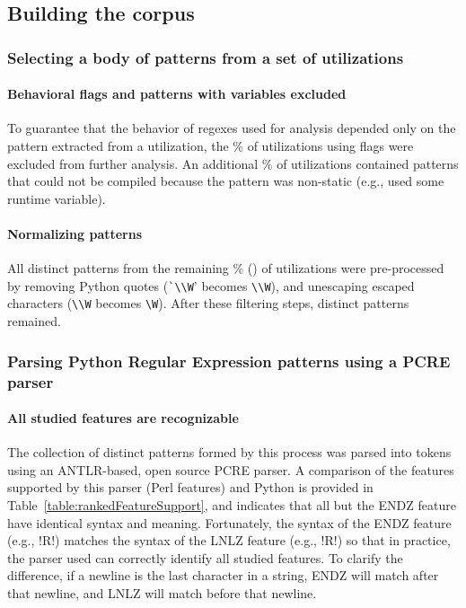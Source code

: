 \subsection{Building the corpus}
\subsubsection{Selecting a body of patterns from a set of utilizations}
\paragraph{Behavioral flags and patterns with variables excluded} To guarantee that the behavior of regexes used for analysis depended only on the pattern extracted from a utilization, the \%  of utilizations using flags were excluded from further analysis.  An additional \% of utilizations contained patterns that could not be compiled because the pattern was non-static (e.g., used some runtime variable).

\paragraph{Normalizing patterns} All distinct patterns from the remaining \% () of utilizations were pre-processed by removing Python quotes (\verb!`\\W!' becomes \verb!\\W!), and unescaping escaped characters (\verb!\\W! becomes \verb!\W!).  After these filtering steps,  distinct patterns remained.

\subsubsection{Parsing Python Regular Expression patterns using a PCRE parser}
\paragraph{All studied features are recognizable} The collection of distinct patterns formed by this process was parsed into tokens using an ANTLR-based, open source PCRE parser.  A comparison of the features supported by this parser (Perl features) and Python is provided in Table~\ref{table:rankedFeatureSupport}, and indicates that all but the ENDZ feature have identical syntax and meaning.  Fortunately, the syntax of the ENDZ feature (e.g., \cverb!R\Z!) matches the syntax of the LNLZ feature (e.g., \cverb!R\Z!) so that in practice, the parser used can correctly identify all studied features.  To clarify the difference, if a newline is the last character in a string, ENDZ will match after that newline, and LNLZ will match before that newline.

